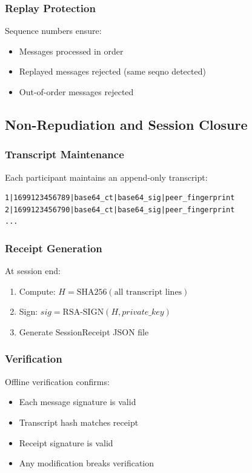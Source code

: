\documentclass[runningheads]{llncs}
\begin{document}
\subsubsection{Replay Protection}

Sequence numbers ensure:
\begin{itemize}
    \item Messages processed in order
    \item Replayed messages rejected (same seqno detected)
    \item Out-of-order messages rejected
\end{itemize}

\subsection{Non-Repudiation and Session Closure}

\subsubsection{Transcript Maintenance}

Each participant maintains an append-only transcript:
\begin{lstlisting}
1|1699123456789|base64_ct|base64_sig|peer_fingerprint
2|1699123456790|base64_ct|base64_sig|peer_fingerprint
...
\end{lstlisting}

\subsubsection{Receipt Generation}

At session end:
\begin{enumerate}
    \item Compute: $H = \text{SHA256}(\text{all transcript lines})$
    \item Sign: $sig = \text{RSA-SIGN}(H, private\_key)$
    \item Generate SessionReceipt JSON file
\end{enumerate}

\subsubsection{Verification}

Offline verification confirms:
\begin{itemize}
    \item Each message signature is valid
    \item Transcript hash matches receipt
    \item Receipt signature is valid
    \item Any modification breaks verification
\end{itemize}
\end{document}
